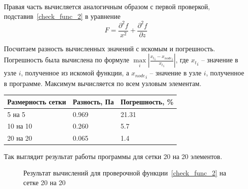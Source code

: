 \documentclass[a4paper,14pt]{extarticle}
\begin{document}
Правая часть вычисляется аналогичным образом с первой проверкой, подставив~\eqref{check_func_2} в уравнение
\begin{equation*}
	F = \frac{\partial^2 f}{x^2} + \frac{\partial^2 f}{\partial z}
\end{equation*} 

Посчитаем разность вычисленных значений с искомым и погрешность. Погрешность была вычислена по формуле $\underset{i}{\max} | \frac{{x_t}_i - {x_{node}}_i}{{x_t}_i} |$, где ${x_t}_i$ -- значение в узле $i$, полученное из искомой функции, а ${x_{node}}_i$ -- значение в узле $i$, полученное в программе. Максимум вычисляется по всем узловым элементам.

\begin{table}[!htbp]
	\begin{tabular}{|l|l|l|}
		\hline
		\multicolumn{1}{|c|}{Размерность сетки} & \multicolumn{1}{c|}{Разность, Па} & Погрешность, \% \\ \hline
		5 на 5                                  & 0.969                              & 21.31            \\ \hline
		10 на 10                                & 0.260                              & 5.7            \\ \hline
		20 на 20                                & 0.065                              & 1.4            \\ \hline
	\end{tabular}
\end{table}

\newpage
Так выглядит результат работы программы для сетки 20 на 20 элементов.
\begin{figure}[!htbp]
	\caption{Результат вычислений для проверочной функции~\eqref{check_func_2} на сетке 20 на 20}
	\label{res_check_func_2}
\end{figure}
\end{document}
